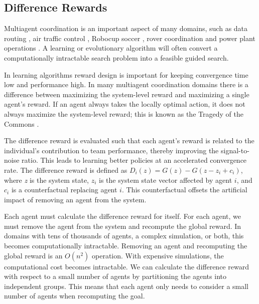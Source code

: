 \documentclass[smallcondensed]{svjour3}
\begin{document}
\subsection{Difference Rewards}
\label{sec:Difference Reward}
Multiagent coordination is an important aspect of many domains, such as data routing \cite{tumer-wolpert_jair02}, air traffic control \cite{tumer-agogino_jaamas12}, Robocup soccer \cite{AAMAS12-agmon}, rover coordination \cite{5509316} and power plant operations \cite{Colby:2012:SFF:2343576.2343637}. A learning or evolutionary algorithm will often convert a computationally intractable search problem into a feasible guided search. 

In learning algorithms reward design is important for keeping convergence time low and performance high. In many multiagent coordination domains there is a difference between maximizing the system-level reward and maximizing a single agent's reward. If an agent always takes the locally optimal action, it does not always maximize the system-level reward; this is known as the Tragedy of the Commons \cite{Hardin}.

The difference reward \cite{tumer-wolpert_jair02} is evaluated such that each agent's reward is related to the individual's contribution to team performance, thereby improving the signal-to-noise ratio. This leads to learning better policies at an accelerated convergence rate. The difference reward is defined as $D_i(z) = G(z) - G(z - z_i + c_i)$, where \textit{z} is the system state, $z_i$ is the system state vector affected by agent $i$, and $c_i$ is a counterfactual replacing agent $i$. This counterfactual offsets the artificial impact of removing an agent from the system.

Each agent must calculate the difference reward for itself. For each agent, we must remove the agent from the system and recompute the global reward. In domains with tens of thousands of agents, a complex simulation, or both, this becomes computationally intractable. Removing an agent and recomputing the global reward is an $O(n^2)$ operation. With expensive simulations, the computational cost becomes intractable.  We can calculate the difference reward with respect to a small number of agents by partitioning the agents into independent groups. This means that each agent only needs to consider a small number of agents when recomputing the goal.

\end{document}
